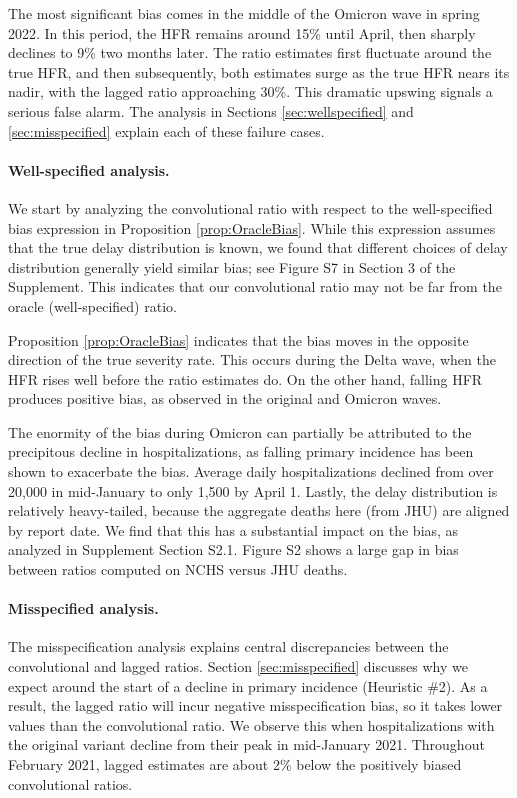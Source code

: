 \documentclass{article}
\begin{document}
The most significant bias comes in the middle of the Omicron wave in spring
2022. In this period, the HFR remains around 15\% until April, then sharply
declines to 9\% two months later. The ratio estimates first fluctuate around the
true HFR, and then subsequently, both estimates surge as the true HFR nears
its nadir, with the lagged ratio approaching 30\%. This dramatic upswing signals
a serious false alarm.  The analysis in Sections \ref{sec:wellspecified} and
\ref{sec:misspecified} explain each of these failure cases. 

\paragraph{Well-specified analysis.}

We start by analyzing the convolutional ratio with respect to the well-specified
bias expression in Proposition \ref{prop:OracleBias}. While this expression
assumes that the true delay distribution is known, we found that different
choices of delay distribution generally yield similar bias; see Figure S7 in Section 3 of the Supplement. 
This indicates that our convolutional ratio may 
not be far from the oracle (well-specified) ratio. 

Proposition \ref{prop:OracleBias} indicates that the bias moves in the opposite
direction of the true severity rate. This occurs during the Delta wave, when the
HFR rises well before the ratio estimates do. On the other hand, falling HFR
produces positive bias, as observed in the original and Omicron waves.  

The enormity of the bias during Omicron can partially be attributed to the
precipitous decline in hospitalizations, as falling primary incidence has been
shown to exacerbate the bias. Average daily hospitalizations declined from over
20,000 in mid-January to only 1,500 by April 1. Lastly, the delay distribution
is relatively heavy-tailed, because the aggregate deaths here (from JHU) are
aligned by report date. 
We find that this has a substantial impact on the bias, 
as analyzed in Supplement Section S2.1. 
Figure S2 shows a large gap in bias between ratios computed on NCHS versus JHU deaths.

\paragraph{Misspecified analysis.}

The misspecification analysis explains central discrepancies between the
convolutional and lagged ratios. Section \ref{sec:misspecified} discusses why we 
expect  around the start of a decline in primary
incidence (Heuristic \#2). As a result, the lagged ratio will incur negative misspecification
bias, so it takes lower values than the convolutional ratio. 
We observe this when hospitalizations with the original variant
decline from their peak in mid-January 2021. Throughout February 2021, lagged
estimates are about 2\% below the positively biased convolutional ratios.   
\end{document}
